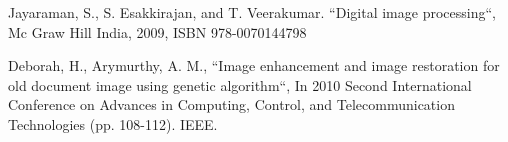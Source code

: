 \documentclass[conference]{IEEEtran}
\begin{document}
\begin{thebibliography}{00}
Jayaraman, S., S. Esakkirajan, and T. Veerakumar. ``Digital image processing``, Mc Graw Hill India, 2009, ISBN 978-0070144798

Deborah, H., Arymurthy, A. M., ``Image enhancement and image restoration for old document image using genetic algorithm``, In 2010 Second International Conference on Advances in Computing, Control, and Telecommunication Technologies (pp. 108-112). IEEE.

\end{thebibliography}
\end{document}
